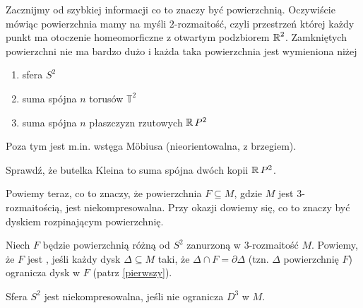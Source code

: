 \documentclass{article}
\begin{document}
Zacznijmy od szybkiej informacji co to znaczy być powierzchnią. Oczywiście mówiąc powierzchnia mamy na myśli $2$-rozmaitość, czyli przestrzeń której każdy punkt ma otoczenie homeomorficzne z otwartym podzbiorem $\operatorname{\mathbb{R}}^2$. Zamkniętych powierzchni nie ma bardzo dużo i każda taka powierzchnia jest wymieniona niżej
\begin{enumerate}
  \item sfera $S^2$
  \item suma spójna $n$ torusów $\mathbb{T}^2$
  \item suma spójna $n$ płaszczyzn rzutowych $\operatorname{\mathbb{R}} P^2$
\end{enumerate}
Poza tym jest m.in. wstęga M\"obiusa (nieorientowalna, z brzegiem).

\begin{problem}
  Sprawdź, że butelka Kleina to suma spójna dwóch kopii $\operatorname{\mathbb{R}} P^2$.
\end{problem}

Powiemy teraz, co to znaczy, że powierzchnia $F\subseteq M$, gdzie $M$ jest $3$-rozmaitością, jest niekompresowalna. Przy okazji dowiemy się, co to znaczy być dyskiem rozpinającym powierzchnię.

\begin{deff} 
  Niech $F$ będzie powierzchnią różną od $S^2$ zanurzoną w $3$-rozmaitość $M$. Powiemy, że $F$ jest , jeśli każdy dysk $\Delta\subseteq M$ taki, że $\Delta\cap F=\partial\Delta$ (tzn. $\Delta$  powierzchnię $F$) ogranicza dysk w $F$ (patrz \cref{pierwszy}).

  Sfera $S^2$ jest niekompresowalna, jeśli nie ogranicza $D^3$ w $M$.
\end{deff}
\end{document}
